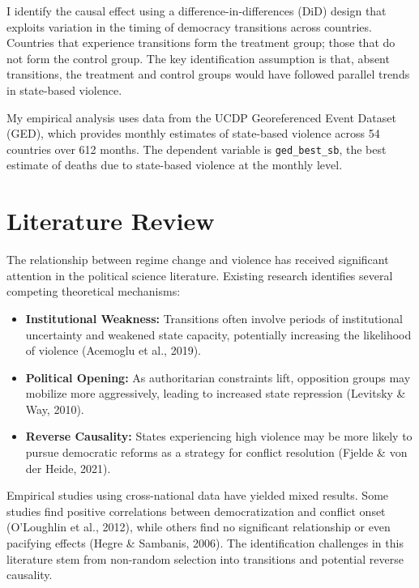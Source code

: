 \documentclass[12pt]{article}
\begin{document}
I identify the causal effect using a difference-in-differences (DiD) design that exploits variation in the timing of democracy transitions across countries. Countries that experience transitions form the treatment group; those that do not form the control group. The key identification assumption is that, absent transitions, the treatment and control groups would have followed parallel trends in state-based violence.

My empirical analysis uses data from the UCDP Georeferenced Event Dataset (GED), which provides monthly estimates of state-based violence across 54 countries over 612 months. The dependent variable is \texttt{ged\_best\_sb}, the best estimate of deaths due to state-based violence at the monthly level.

\section{Literature Review}

The relationship between regime change and violence has received significant attention in the political science literature. Existing research identifies several competing theoretical mechanisms:

\begin{itemize}
    \item \textbf{Institutional Weakness:} Transitions often involve periods of institutional uncertainty and weakened state capacity, potentially increasing the likelihood of violence (Acemoglu et al., 2019).

    \item \textbf{Political Opening:} As authoritarian constraints lift, opposition groups may mobilize more aggressively, leading to increased state repression (Levitsky \& Way, 2010).

    \item \textbf{Reverse Causality:} States experiencing high violence may be more likely to pursue democratic reforms as a strategy for conflict resolution (Fjelde \& von der Heide, 2021).
\end{itemize}

Empirical studies using cross-national data have yielded mixed results. Some studies find positive correlations between democratization and conflict onset (O'Loughlin et al., 2012), while others find no significant relationship or even pacifying effects (Hegre \& Sambanis, 2006). The identification challenges in this literature stem from non-random selection into transitions and potential reverse causality.
\end{document}
